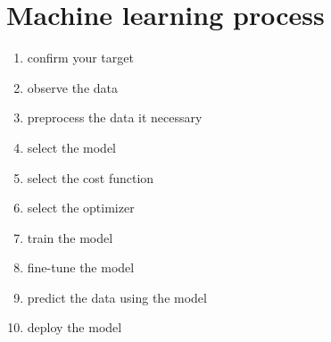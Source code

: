 
\chapter{Machine learning process}
\label{cha:mach-learn-proc}

\begin{enumerate}
  
\item confirm your target
\item observe the data
\item preprocess the data it necessary
\item select the model
\item select the cost function
\item select the optimizer
\item train the model
\item fine-tune the model
\item predict the data using the model
\item deploy the model
\end{enumerate}
